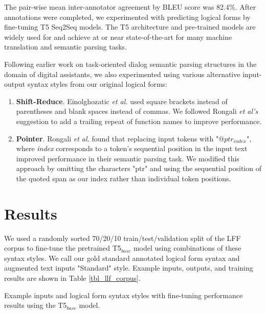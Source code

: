 \documentclass[../main.tex]{subfiles}
\begin{document}
The pair-wise mean inter-annotator agreement by BLEU score was 82.4\%. After annotations were completed, we experimented with predicting logical forms by fine-tuning T5 \cite{raffel2020exploring} Seq2Seq models. The T5 architecture and pre-trained models are widely used for and achieve at or near state-of-the-art for many machine translation and semantic parsing tasks. 

Following earlier work on task-oriented dialog semantic parsing structures in the domain of digital assistants, we also experimented using various alternative input-output syntax styles from our original logical forms:

\begin{enumerate}
    \item \textbf{Shift-Reduce}. Einolghozatic \textit{et al.} \cite{einolghozati2019improving} used square brackets instead of parentheses and blank spaces instead of commas. We followed Rongali \textit{et al's} suggestion to add a trailing repeat of function names to improve performance.
    \item \textbf{Pointer}. Rongali \textit{et al.} \cite{rongali2020don} found that replacing input tokens with "$@ptr_{index}$", where \textit{index} corresponds to a token's sequential position in the input text improved performance in their semantic parsing task. We modified this approach by omitting the characters "ptr" and using the sequential position of the quoted span as our index rather than individual token positions.
\end{enumerate}

\section{Results}

We used a randomly sorted 70/20/10 train/test/validation split of the LFF corpus to fine-tune the pretrained T5$_{base}$ model using combinations of these syntax styles. We call our gold standard annotated logical form syntax and augmented text inputs "Standard" style. Example inputs, outputs, and training results are shown in Table \ref{tbl_llf_corpus}. 

\begin{table}[!ht]
    \footnotesize
    \centering
    
    \caption{Example inputs and logical form syntax styles with fine-tuning performance results using the T5$_{base}$ model.}
    \label{tbl_llf_corpus}
\end{table} 
\end{document}
